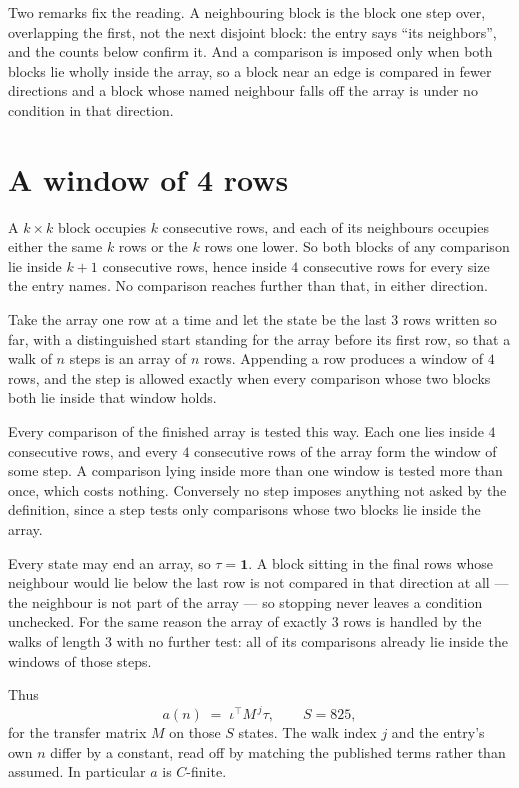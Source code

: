 \documentclass[11pt,a4paper]{article}
\theoremstyle{plain}
\theoremstyle{definition}
\begin{document}
Two remarks fix the reading. A neighbouring block is the block one step over, overlapping the
first, not the next disjoint block: the entry says ``its neighbors'', and the counts below
confirm it. And a comparison is imposed only when both blocks lie wholly inside the array, so a
block near an edge is compared in fewer directions and a block whose named neighbour falls off
the array is under no condition in that direction.

\section{A window of 4 rows}

A $k\times k$ block occupies $k$ consecutive rows, and each of its neighbours occupies either
the same $k$ rows or the $k$ rows one lower. So both blocks of any comparison lie inside $k+1$
consecutive rows, hence inside $4$ consecutive rows for every size the entry names. No
comparison reaches further than that, in either direction.

Take the array one row at a time and let the state be the last 3 rows written so far, with a
distinguished start standing for the array before its first row, so that a walk of $n$ steps is
an array of $n$ rows. Appending a row produces a window of $4$ rows, and the step is
allowed exactly when every comparison whose two blocks both lie inside that window holds.

Every comparison of the finished array is tested this way. Each one lies inside $4$
consecutive rows, and every $4$ consecutive rows of the array form the window of some
step. A comparison lying inside more than one window is tested more than once, which costs
nothing. Conversely no step imposes anything not asked by the definition, since a step tests
only comparisons whose two blocks lie inside the array.

Every state may end an array, so $\tau=\mathbf{1}$. A block sitting in the final rows whose
neighbour would lie below the last row is not compared in that direction at all --- the
neighbour is not part of the array --- so stopping never leaves a condition unchecked. For the
same reason the array of exactly $3$ rows is handled by the walks of length $3$ with no
further test: all of its comparisons already lie inside the windows of those steps.

Thus
\[
a(n)\;=\;\iota^{\!\top}M^{\,j}\tau ,\qquad S=825,
\]
for the transfer matrix $M$ on those $S$ states. The walk index $j$ and the entry's own $n$
differ by a constant, read off by matching the published terms rather than assumed. In
particular $a$ is $C$-finite.
\end{document}
